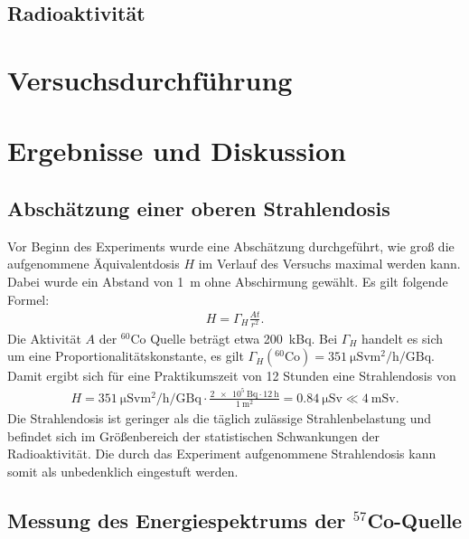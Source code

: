 \documentclass[a4paper,twoside,final]{article}
\begin{document}
\subsection{Radioaktivität}

\section{Versuchsdurchführung} \label{sec:Versuchsdurchführung}

\newpage
\section{Ergebnisse und Diskussion}
\subsection{Abschätzung einer oberen Strahlendosis}
Vor Beginn des Experiments wurde eine Abschätzung durchgeführt, wie groß die aufgenommene Äquivalentdosis $H$ im Verlauf des Versuchs maximal werden kann. Dabei wurde ein Abstand von \SI{1}{\metre} ohne Abschirmung gewählt. Es gilt folgende Formel:
\begin{align}
  H = \Gamma_H \frac{A t}{r^2}.
\end{align}
Die Aktivität $A$ der $^{60}$Co Quelle beträgt etwa \SI{200}{\kilo\becquerel}. Bei $\Gamma_H$ handelt es sich um eine Proportionalitätskonstante, es gilt $\Gamma_H(^{60}\text{Co})= \SI{351}{\micro\sievert\metre\squared\per\hour\per\giga\becquerel}$. Damit ergibt sich für eine Praktikumszeit von 12 Stunden eine Strahlendosis von
\begin{align}
  H = \SI[per-mode=fraction]{351}{\micro\sievert\metre\squared\per\hour\per\giga\becquerel} \cdot\frac{\SI{2e5}{\becquerel}\cdot\SI{12}{\hour}}{\SI{1}{\metre\squared}}= \SI{0,84}{\micro\sievert} \ll \SI{4}{\milli\sievert}.
\end{align}
Die Strahlendosis ist geringer als die täglich zulässige Strahlenbelastung und befindet sich im Größenbereich der statistischen Schwankungen der Radioaktivität. Die durch das Experiment aufgenommene Strahlendosis kann somit als unbedenklich eingestuft werden.

\subsection{Messung des Energiespektrums der $^{57}$Co-Quelle}
\end{document}
